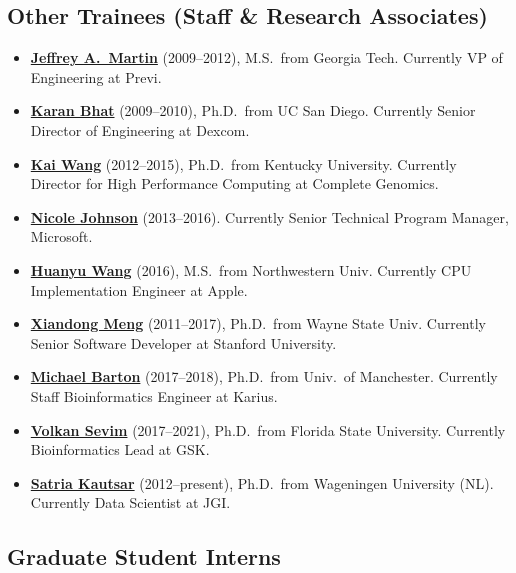 \documentclass[11pt,letterpaper]{article}
\newenvironment{cvlist}
  {\begin{itemize}[leftmargin=1.4em, label=\textcolor{accent2}{\small$\bullet$},
    itemsep=2.5pt, topsep=2pt, parsep=0pt]}
  {\end{itemize}}
\begin{document}
\subsection{Other Trainees (Staff \& Research Associates)}
\begin{cvlist}
  \item \href{https://www.linkedin.com/in/jeff-martin-99a91016/}{\textbf{Jeffrey A.\ Martin}} (2009--2012), M.S.\ from Georgia Tech. Currently VP of Engineering at Previ.
  \item \href{https://www.linkedin.com/in/karanb/}{\textbf{Karan Bhat}} (2009--2010), Ph.D.\ from UC San Diego. Currently Senior Director of Engineering at Dexcom.
  \item \href{https://www.linkedin.com/in/kai-wang-19000033/}{\textbf{Kai Wang}} (2012--2015), Ph.D.\ from Kentucky University. Currently Director for High Performance Computing at Complete Genomics.
  \item \href{https://www.linkedin.com/in/nicolejohnsonphd/}{\textbf{Nicole Johnson}} (2013--2016). Currently Senior Technical Program Manager, Microsoft.
  \item \href{https://www.linkedin.com/in/huanyu-wang-8a1097b0/}{\textbf{Huanyu Wang}} (2016), M.S.\ from Northwestern Univ. Currently CPU Implementation Engineer at Apple.
  \item \href{https://www.linkedin.com/in/xian-dong-meng-59600013/}{\textbf{Xiandong Meng}} (2011--2017), Ph.D.\ from Wayne State Univ. Currently Senior Software Developer at Stanford University.
  \item \href{https://www.linkedin.com/in/michael-barton-70bb7716/}{\textbf{Michael Barton}} (2017--2018), Ph.D.\ from Univ.\ of Manchester. Currently Staff Bioinformatics Engineer at Karius.
  \item \href{https://www.linkedin.com/in/volkansevim/}{\textbf{Volkan Sevim}} (2017--2021), Ph.D.\ from Florida State University. Currently Bioinformatics Lead at GSK.
  \item \href{https://www.linkedin.com/in/satriaphd/}{\textbf{Satria Kautsar}} (2012--present), Ph.D.\ from Wageningen University (NL). Currently Data Scientist at JGI.
\end{cvlist}

\subsection{Graduate Student Interns}
\end{document}

